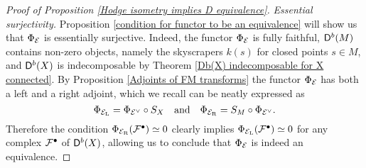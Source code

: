 \begin{proof}[Proof of Proposition \ref{Hodge isometry implies D equivalence}]
    

    \vspace{0.3 cm}
    \noindent
    \textsl{Essential surjectivity.} Proposition \ref{condition for functor to be an equivalence} will show us that $\Phi_{\mathcal E}$ is essentially surjective. Indeed, the functor $\Phi_{\mathcal E}$ is fully faithful, $\mathsf{D}^b(M)$ contains non-zero objects, namely the skyscrapers $k(s)$ for closed points $s \in M$, and $\mathsf{D}^b(X)$ is indecomposable by Theorem \ref{Db(X) indecomposable for X connected}. By Proposition \ref{Adjoints of FM transforms} the functor $\Phi_{\mathcal E}$ has both a left and a right adjoint, which we recall can be neatly expressed as
    \[
        \Phi_{\mathcal E_\mathrm{L}} = \Phi_{\mathcal E^\vee} \circ S_X \quad \text{and} \quad \Phi_{\mathcal E_\mathrm{R}} = S_M \circ \Phi_{\mathcal E^\vee}.
    \]
    Therefore the condition $\Phi_{\mathcal E_\mathrm{R}}(\mathcal F^\bullet) \simeq 0$ clearly implies $\Phi_{\mathcal E_\mathrm{L}}(\mathcal F^\bullet) \simeq 0$ for any complex $\mathcal F^\bullet$ of $\mathsf{D}^b(X)$, allowing us to conclude that $\Phi_{\mathcal E}$ is indeed an equivalence.


\end{proof}
